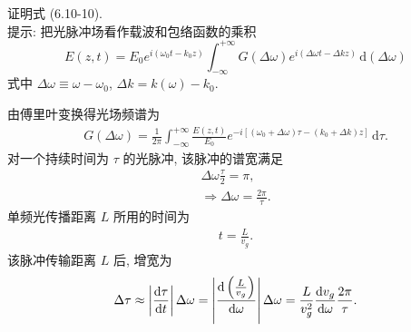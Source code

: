 \documentclass{note}
\begin{document}
\begin{exe}
    证明式 (6.10-10).\\
    提示: 把光脉冲场看作载波和包络函数的乘积
    \[
        E(z,t)=E_0e^{i(\omega_0t-k_0z)}\int_{-\infty}^{+\infty}G(\Delta\omega)e^{i(\Delta\omega t-\Delta kz)}\,\mathrm{d}(\Delta\omega)
    \]
    式中 $\Delta\omega\equiv\omega-\omega_0$, $\Delta k=k(\omega)-k_0$.
\end{exe}
\begin{pf}
    由傅里叶变换得光场频谱为
    \begin{align}
        G(\Delta\omega)=\frac{1}{2\pi}\int_{-\infty}^{+\infty}\frac{E(z,t)}{E_0}e^{-i[(\omega_0+\Delta\omega)\tau-(k_0+\Delta k)z]}\,\mathrm{d}\tau.
    \end{align}
    对一个持续时间为 $\tau$ 的光脉冲, 该脉冲的谱宽满足
    \begin{gather}
        \Delta\omega\frac{\tau}{2}=\pi,\\
        \Longrightarrow\Delta\omega=\frac{2\pi}{\tau}.
    \end{gather}
    单频光传播距离 $L$ 所用的时间为
    \begin{align}
        t=\frac{L}{v_g}.
    \end{align}
    该脉冲传输距离 $L$ 后, 增宽为
    \begin{align}
        \Delta\tau\approx\left\lvert\frac{\mathrm{d}\tau}{\mathrm{d}t}\right\rvert\Delta\omega=\left\lvert\frac{\mathrm{d}\left(\frac{L}{v_g}\right)}{\mathrm{d}\omega}\right\rvert\Delta\omega=\frac{L}{v_g^2}\frac{\mathrm{d}v_g}{\mathrm{d}\omega}\frac{2\pi}{\tau}.
    \end{align}
\end{pf}
\end{document}
